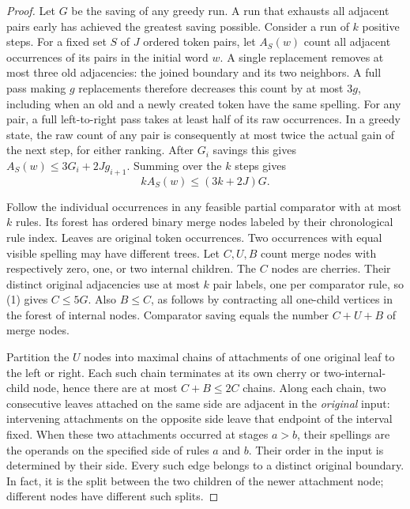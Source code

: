 \documentclass[11pt]{article}
\begin{document}
\begin{proof}
Let $G$ be the saving of any greedy run. A run that exhausts all adjacent pairs early has achieved the greatest saving possible. Consider a run of $k$ positive steps. For a fixed set $S$ of $J$ ordered token pairs, let $A_S(w)$ count all adjacent occurrences of its pairs in the initial word $w$. A single replacement removes at most three old adjacencies: the joined boundary and its two neighbors. A full pass making $g$ replacements therefore decreases this count by at most $3g$, including when an old and a newly created token have the same spelling. For any pair, a full left-to-right pass takes at least half of its raw occurrences. In a greedy state, the raw count of any pair is consequently at most twice the actual gain of the next step, for either ranking. After $G_i$ savings this gives $A_S(w)\le 3G_i+2Jg_{i+1}$. Summing over the $k$ steps gives
\[
 kA_S(w)\le(3k+2J)G. \tag{1}
\]

Follow the individual occurrences in any feasible partial comparator with at most $k$ rules. Its forest has ordered binary merge nodes labeled by their chronological rule index. Leaves are original token occurrences. Two occurrences with equal visible spelling may have different trees. Let $C,U,B$ count merge nodes with respectively zero, one, or two internal children. The $C$ nodes are cherries. Their distinct original adjacencies use at most $k$ pair labels, one per comparator rule, so (1) gives $C\le5G$. Also $B\le C$, as follows by contracting all one-child vertices in the forest of internal nodes. Comparator saving equals the number $C+U+B$ of merge nodes.

Partition the $U$ nodes into maximal chains of attachments of one original leaf to the left or right. Each such chain terminates at its own cherry or two-internal-child node, hence there are at most $C+B\le2C$ chains. Along each chain, two consecutive leaves attached on the same side are adjacent in the \emph{original} input: intervening attachments on the opposite side leave that endpoint of the interval fixed. When these two attachments occurred at stages $a>b$, their spellings are the operands on the specified side of rules $a$ and $b$. Their order in the input is determined by their side. Every such edge belongs to a distinct original boundary. In fact, it is the split between the two children of the newer attachment node; different nodes have different such splits.


\end{proof}
\end{document}
